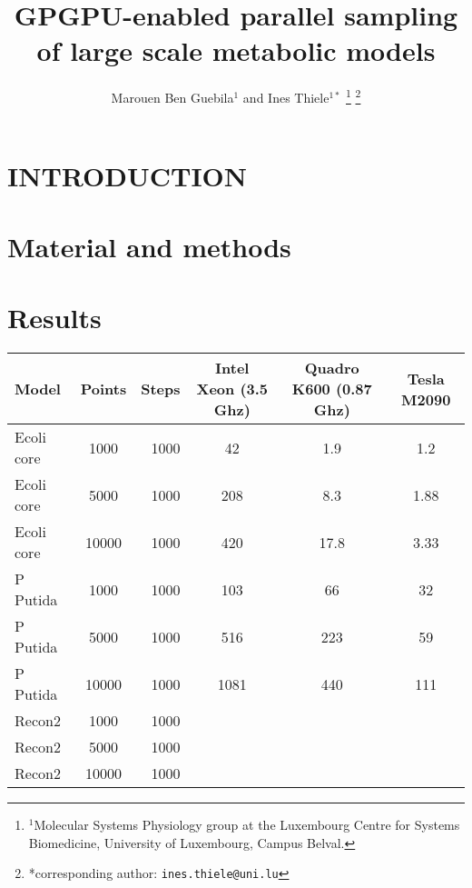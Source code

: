 \documentclass[letterpaper, 10 pt, conference]{ieeeconf}  %
\title{\LARGE \bf
GPGPU-enabled parallel sampling of large scale metabolic models
}
\author{Marouen Ben Guebila$^{1}$ and Ines Thiele$^{1*}$%
\thanks{$^{1}$Molecular Systems Physiology group at the Luxembourg Centre for Systems Biomedicine,
        University of Luxembourg, Campus Belval.
        }%
\thanks{*corresponding author: {\tt\small ines.thiele@uni.lu}}
}
\begin{document}
\maketitle
\thispagestyle{empty}
\pagestyle{empty}


\begin{abstract}



\end{abstract}


\section{INTRODUCTION}




\addtolength{\textheight}{-12cm}   %








\section{Material and methods}

\section{Results}
\begin{tabular}{|l|c|r|c|c|c|}
  \hline
  Model & Points & Steps & Intel Xeon (3.5 Ghz) & Quadro K600 (0.87 Ghz) & Tesla M2090 \\
  \hline
   Ecoli core& 1000& 1000& 42 & 1.9 & 1.2\\
   Ecoli core& 5000& 1000& 208 & 8.3 & 1.88\\
   Ecoli core& 10000& 1000& 420 & 17.8 & 3.33\\
   P Putida  & 1000& 1000& 103 & 66 & 32\\
   P Putida  & 5000& 1000& 516 &  223 & 59\\
   P Putida  & 10000& 1000& 1081 & 440 & 111\\
   Recon2  & 1000& 1000&  & & \\
   Recon2  & 5000& 1000&  & & \\
   Recon2  & 10000& 1000&  & & \\
  \hline
\end{tabular}
\end{document}
